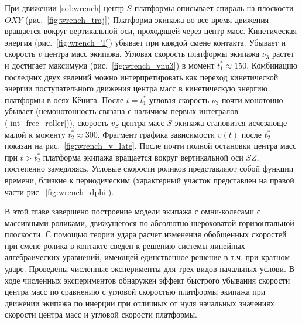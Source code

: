 При движении \ref{sol:wrench} центр $S$ платформы описывает спираль на плоскости $OXY$ (рис.~\ref{fig:wrench_traj}) Платформа экипажа во все время движения вращается вокруг вертикальной оси, проходящей через центр масс. Кинетическая энергия (рис.~\ref{fig:wrench_T}) убывает при каждой смене контакта. Убывает и скорость $v$ центра масс экипажа. Угловая скорость платформы экипажа $\nu_3$ растет и достигает максимума (рис.~\ref{fig:wrench_vnu3}) в момент $t^*_1 \approx 150$. Комбинацию последних двух явлений можно интерпретировать как переход кинетической энергии поступательного движения центра масс в кинетическую энергию платформы в осях Кёнига. После $t = t^*_1$ угловая скорость $\nu_3$ почти монотонно убывает (немонотонность связана с наличием первых интегралов (\ref{int_free_roller})), скорость $v_S$ центра масс $S$ экипажа становится исчезающе малой к моменту $t^*_2 \approx 300$. Фрагмент графика зависимости $v(t)$ после $t^*_2$ показан на рис.~\ref{fig:wrench_v_late}. После почти полной остановки центра масс при  $t > t^*_2$ платформа экипажа вращается вокруг вертикальной оси $SZ$, постепенно замедляясь. Угловые скорости роликов представляют собой функции времени, близкие к периодическим (характерный участок представлен на правой части рис.~\ref{fig:wrench_dphi}).

В этой главе завершено построение модели экипажа с омни-колесами с массивными роликами, движущегося по абсолютно шероховатой горизонтальной плоскости. С помощью теории удара расчет изменения обобщенных скоростей при смене ролика в контакте сведен к решению системы линейных алгебраических уравнений, имеющей единственное решение в т.ч. при кратном ударе. Проведены численные эксперименты для трех видов начальных услови. В ходе численных экспериментов обнаружен эффект быстрого убывания скорости центра масс по сравнению с угловой скоростью платформы экипажа при движении экипажа по инерции при отличных от нуля начальных значениях скорости центра масс и угловой скорости платформы. 

\newpage



